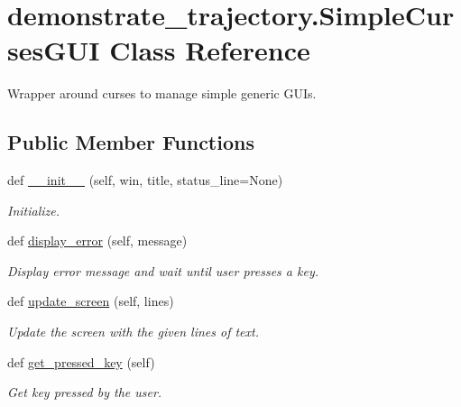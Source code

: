 \hypertarget{classdemonstrate__trajectory_1_1SimpleCursesGUI}{}\section{demonstrate\+\_\+trajectory.\+Simple\+Curses\+G\+UI Class Reference}
\label{classdemonstrate__trajectory_1_1SimpleCursesGUI}


Wrapper around curses to manage simple generic G\+U\+Is.  


\subsection*{Public Member Functions}
\begin{DoxyCompactItemize}
\item 
def \hyperlink{classdemonstrate__trajectory_1_1SimpleCursesGUI_a75bb22b79a52c4aaaf98c5349b2d5992}{\+\_\+\+\_\+init\+\_\+\+\_\+} (self, win, title, status\+\_\+line=None)
\begin{DoxyCompactList}\small\item\em Initialize. \end{DoxyCompactList}\item 
def \hyperlink{classdemonstrate__trajectory_1_1SimpleCursesGUI_abda27a311898db3c5b5f6dc9ad4351bf}{display\+\_\+error} (self, message)
\begin{DoxyCompactList}\small\item\em Display error message and wait until user presses a key. \end{DoxyCompactList}\item 
def \hyperlink{classdemonstrate__trajectory_1_1SimpleCursesGUI_ae9ba316b4409ee4a52db5f373b833948}{update\+\_\+screen} (self, lines)
\begin{DoxyCompactList}\small\item\em Update the screen with the given lines of text. \end{DoxyCompactList}\item 
def \hyperlink{classdemonstrate__trajectory_1_1SimpleCursesGUI_a273895ec6e0192cc5284af7f91023c68}{get\+\_\+pressed\+\_\+key} (self)
\begin{DoxyCompactList}\small\item\em Get key pressed by the user. \end{DoxyCompactList}\end{DoxyCompactItemize}
